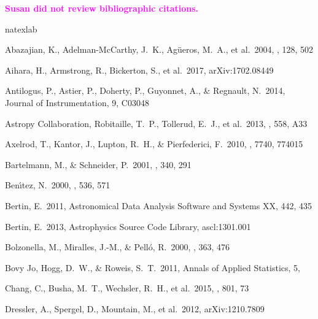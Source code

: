 \documentclass[useamsfonts]{pasj01}
\newcommand{\susan}[1]{\textcolor{magenta} {\textbf{#1}}}
\begin{document}
\susan{Susan did not review bibliographic citations.}
\begin{thebibliography}{}
    \label{sec:ref}
    \expandafter\ifx\csname natexlab\endcsname\relax\def\natexlab#1{#1}\fi

     Abazajian, K., Adelman-McCarthy,
             J.~K., Ag{\"u}eros, M.~A., et al.\ 2004, \aj, 128, 502

     Aihara, H., Armstrong, R., Bickerton, S.,
             et al.\ 2017, arXiv:1702.08449

     Antilogus, P., Astier, P.,
             Doherty, P., Guyonnet, A., \& Regnault, N.\ 2014, Journal of
             Instrumentation, 9, C03048

     Astropy Collaboration,
             Robitaille, T.~P., Tollerud, E.~J., et al.\ 2013, \aap, 558, A33

     Axelrod, T., Kantor, J., Lupton,
             R.~H., \& Pierfederici, F.\ 2010, \procspie, 7740, 774015

     Bartelmann, M., \&
             Schneider, P.\ 2001, \physrep, 340, 291

     Ben{\'{\i}}tez, N.\ 2000, \apj,
             536, 571

     Bertin, E.\ 2011, Astronomical Data Analysis
             Software and Systems XX, 442, 435

     Bertin, E.\ 2013, Astrophysics Source
             Code Library, ascl:1301.001

     Bolzonella, M., Miralles, J.-M.,
            \& Pell{\'o}, R.\ 2000, \aap, 363, 476

     Bovy Jo, Hogg, D.~W., \& Roweis,
             S.~T.\ 2011, Annals of Applied Statistics, 5,

     Chang, C., Busha, M.~T., Wechsler, R.~H.,
             et al.\ 2015, \apj, 801, 73

     Dressler, A., Spergel, D., Mountain,
             M., et al.\ 2012, arXiv:1210.7809


\end{thebibliography}
\end{document}
